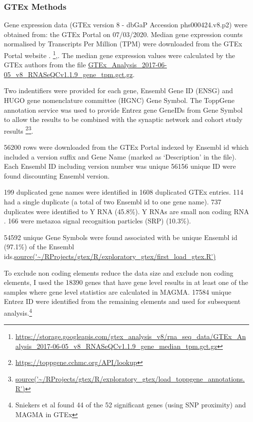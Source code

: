 \subsubsection{GTEx Methods}
\label{sec:GTEx methods}
 Gene expression data (GTEx version 8 - dbGaP Accession phs000424.v8.p2) were obtained from: the GTEx Portal on 07/03/2020. Median gene expression counts normalised by Transcripts Per Million (TPM) were downloaded from the GTEx Portal website \cite{gtex2015genotype}.
 \footnote{\url{https://storage.googleapis.com/gtex_analysis_v8/rna_seq_data/GTEx_Analysis_2017-06-05_v8_RNASeQCv1.1.9_gene_median_tpm.gct.gz}}\cite{gtex2015genotype},\cite{conesa2016survey}. The median gene expression values were calculated by the GTEx authors from the file \url{GTEx_Analysis_2017-06-05_v8_RNASeQCv1.1.9_gene_tpm.gct.gz}. 
 
 Two indentifiers were provided for each gene, Ensembl Gene ID (ENSG) and HUGO gene nomenclature committee (HGNC) Gene Symbol\cite{gray2012genenames}. The ToppGene annotation service \cite{chen2009toppgene} was used to provide Entrez gene GeneIDs from Gene Symbol to allow the results to be combined with the synaptic network and cohort study results \footnote{\url{https://toppgene.cchmc.org/API/lookup}}\footnote{\url{source('~/RProjects/gtex/R/exploratory_gtex/load_toppgene_annotations.R')}}.

56200 rows were downloaded from the GTEx Portal indexed by Ensembl id which included a version suffix and Gene Name (marked as `Description' in the file). Each Ensembl ID including version number was unique 56156 unique ID were found discounting Ensembl version.

199 duplicated gene names were identified in 1608 duplicated GTEx entries. 114 had a single duplicate (a total of two Ensembl id to one gene name). 737 duplicates were identified to Y RNA (45.8\%). Y RNAs are small non coding RNA \cite{perreault2007ro}. 166 were metazoa signal recognition particles (SRP)\cite{keenan2001signal} (10.3\%). 

54592 unique Gene Symbols were found associated with  be unique Ensembl id (97.1\%) of the Ensembl ids.\url{source('~/RProjects/gtex/R/exploratory_gtex/first_load_gtex.R')} 

To exclude non coding elements  reduce the data size and exclude non coding elements, I used the 18390 genes that have gene level results in at least one of the samples where gene level statistics are calculated in MAGMA. 17584 unique Entrez ID were identified from the remaining elements and used for subsequent analysis.\footnote{Sniekers et al found 44 of the 52 significant genes (using SNP proximity) and MAGMA in GTEx}

